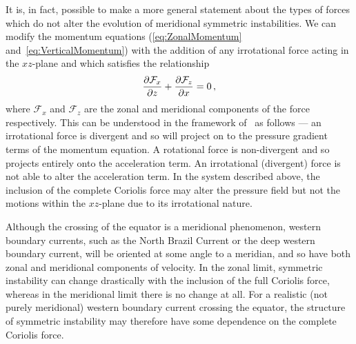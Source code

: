     It is, in fact, possible to make a more general statement about the types of forces which do not alter the evolution of meridional symmetric instabilities. We can modify the momentum equations (\ref{eq:ZonalMomentum} and~\ref{eq:VerticalMomentum}) with the addition of any irrotational force acting in the $xz$-plane and which satisfies the relationship
    \begin{equation}
        \pdv{\mathcal{F}_x}{z} + \pdv{\mathcal{F}_z}{x} = 0 \, ,
    \end{equation}
    where $\mathcal{F}_x$ and $\mathcal{F}_z$ are the zonal and meridional components of the force respectively. This can be understood in the framework of~\citet{Marshall2011} as follows --- an irrotational force is divergent and so will project on to the pressure gradient terms of the momentum equation. A rotational force is non-divergent and so projects entirely onto the acceleration term. An irrotational (divergent) force is not able to alter the acceleration term. In the system described above, the inclusion of the complete Coriolis force may alter the pressure field but not the motions within the $xz$-plane due to its irrotational nature.

    Although the crossing of the equator is a meridional phenomenon, western boundary currents, such as the North Brazil Current or the deep western boundary current, will be oriented at some angle to a meridian, and so have both zonal and meridional components of velocity. In the zonal limit, symmetric instability can change drastically with the inclusion of the full Coriolis force, whereas in the meridional limit there is no change at all. For a realistic (not purely meridional) western boundary current crossing the equator, the structure of symmetric instability may therefore have some dependence on the complete Coriolis force.
    
